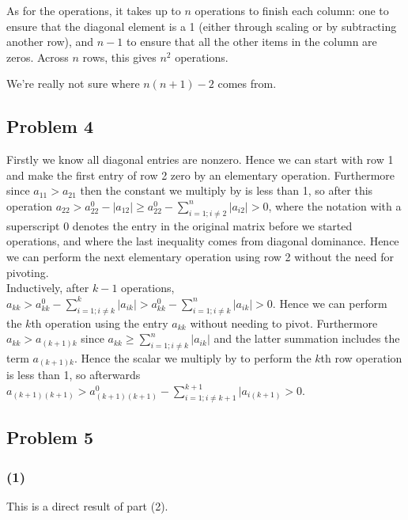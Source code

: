\documentclass{article}
\begin{document}
As for the operations, it takes up to $n$ operations to finish each column:
one to ensure that the diagonal element is a 1 (either through scaling or by
subtracting another row), and $n-1$ to ensure that all the other items in the
column are zeros. Across $n$ rows, this gives $n^2$ operations.

We're really not sure where $n(n+1) - 2$ comes from.

\subsection{Problem 4}
Firstly we know all diagonal entries are nonzero. Hence we can start with row 1 and make the first entry of row 2 zero by an elementary operation. Furthermore since $a_{11}>a_{21}$ then the constant we multiply by is less than 1, so after this operation $a_{22}> a_{22}^0 - |a_{12}|\ge a_{22}^0 - \displaystyle\sum_{i=1; i\neq 2}^n |a_{i2}|>0$, where the notation with a superscript 0 denotes the entry in the original matrix before we started operations, and where the last inequality comes from diagonal dominance. Hence we can perform the next elementary operation using row 2 without the need for pivoting.
\\Inductively, after $k-1$ operations, $a_{kk}>a_{kk}^0 - \displaystyle\sum_{i=1; i\neq k}^k |a_{ik}| > a_{kk}^0 - \displaystyle\sum_{i=1; i\neq k}^n |a_{ik}| > 0$. Hence we can perform the $k$th operation using the entry $a_{kk}$ without needing to pivot. Furthermore $a_{kk}>a_{(k+1)k}$ since $a_{kk}\ge \displaystyle\sum_{i=1; i\neq k}^n |a_{ik}|$ and the latter summation includes the term $a_{(k+1)k}$. Hence the scalar we multiply by to perform the $k$th row operation is less than 1, so afterwards $a_{(k+1)(k+1)}>a_{(k+1)(k+1)}^0 - \displaystyle\sum_{i=1; i\neq k+1}^{k+1} |a_{i(k+1)}>0$. 

\subsection{Problem 5}
\subsubsection{(1)}
This is a direct result of part (2).
\end{document}
